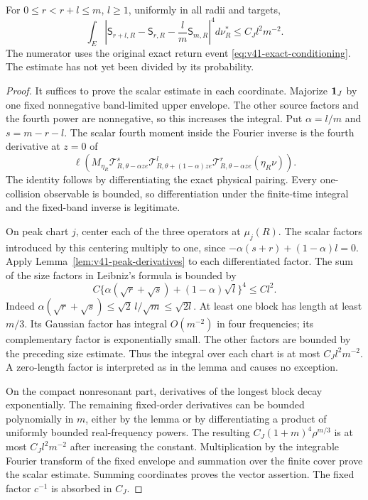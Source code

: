 \begin{proposition}
\label{prop:v41-pinned-fourth}
For $0\le r<r+l\le m$, $l\ge1$, uniformly in all radii and targets,
\begin{equation}\label{eq:v41-pinned-fourth}
 \int_E\left|\mathsf S_{r+l,R}-\mathsf S_{r,R}
                         -\frac lm\mathsf S_{m,R}\right|^4d\nu_R^*
                              \le C_J l^2m^{-2}.
\end{equation}
The numerator uses the original exact return event
\eqref{eq:v41-exact-conditioning}. The estimate has not yet been
divided by its probability.
\end{proposition}
\begin{proof}
It suffices to prove the scalar estimate in each coordinate. Majorize
$\mathbf1_J$ by one fixed nonnegative band-limited upper envelope. The
other source factors and the fourth power are nonnegative, so this
increases the integral. Put $\alpha=l/m$ and $s=m-r-l$. The scalar
fourth moment inside the Fourier inverse is the fourth derivative at
$z=0$ of
\[
 \ell\left(M_{\eta_R}
  \mathscr T_{R,\theta-\alpha ze}^{s}
  \mathscr T_{R,\theta+(1-\alpha)ze}^{l}
  \mathscr T_{R,\theta-\alpha ze}^{r}(\eta_R\nu)\right).
\]
The identity follows by differentiating the exact physical pairing.
Every one-collision observable is bounded, so differentiation under
the finite-time integral and the fixed-band inverse is legitimate.

On peak chart $j$, center each of the three operators at $\mu_j(R)$.
The scalar factors introduced by this centering multiply to one,
since $-\alpha(s+r)+(1-\alpha)l=0$. Apply
Lemma~\ref{lem:v41-peak-derivatives} to each differentiated factor.
The sum of the size factors in Leibniz's formula is bounded by
\[
 C\{\alpha(\sqrt r+\sqrt s)+(1-\alpha)\sqrt l\}^4
       \le C l^2.
\]
Indeed $\alpha(\sqrt r+\sqrt s)\le\sqrt2\,l/\sqrt m
\le\sqrt{2l}$. At least one block has length at least $m/3$.
Its Gaussian factor has integral $O(m^{-2})$ in four frequencies;
its complementary factor is exponentially small. The other factors
are bounded by the preceding size estimate. Thus the integral over
each chart is at most $C_Jl^2m^{-2}$. A zero-length factor is interpreted
as in the lemma and causes no exception.

On the compact nonresonant part, derivatives of the longest block
decay exponentially. The remaining fixed-order derivatives can be
bounded polynomially in $m$, either by the lemma or by differentiating
a product of uniformly bounded real-frequency powers. The resulting
$C_J(1+m)^4\rho^{m/3}$ is at most $C_Jl^2m^{-2}$ after increasing
the constant. Multiplication by the integrable Fourier transform of
the fixed envelope and summation over the finite cover prove the
scalar estimate. Summing coordinates proves the vector assertion.
The fixed factor $c^{-1}$ is absorbed in $C_J$.
\end{proof}

